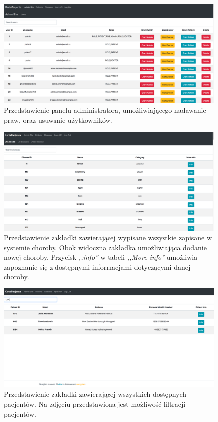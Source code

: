 \begin{figure}[H]
\centering
\includegraphics[width=15cm]{pictures/service/02-admin_panel}
\caption{Przedstawienie panelu administratora, umożliwiającego nadawanie praw, oraz usuwanie użytkowników.}
\end{figure}

\begin{figure}[H]
\centering
\includegraphics[width=15cm]{pictures/service/04-choroby}
\caption{Przedstawienie zakładki zawierającej wypisane wszystkie zapisane w systemie choroby. Obok widoczna zakładka umożliwiająca dodanie nowej choroby. Przycisk \textit{,,info''} w tabeli \textit{,,More info''} umożliwia zapoznanie się z dostępnymi informacjami dotyczącymi danej choroby.}
\end{figure}

\begin{figure}[H]
\centering
\includegraphics[width=15cm]{pictures/service/03-patients}
\caption{Przedstawienie zakładki zawierającej wszystkich dostępnych pacjentów. Na zdjęciu przedstawiona jest możliwość filtracji pacjentów.}
\end{figure}

